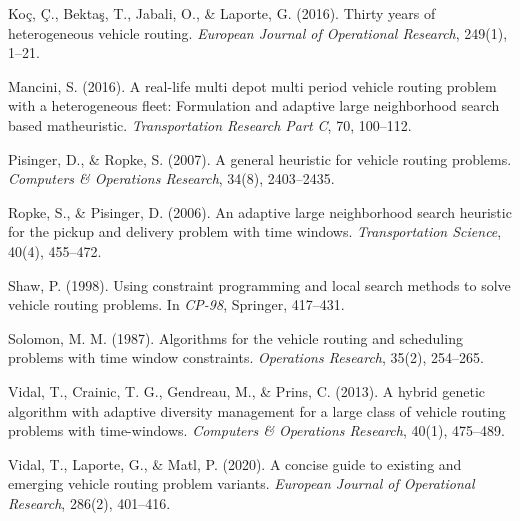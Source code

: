 \documentclass[11pt]{article}
\begin{document}
\begin{enumerate}[label={[\arabic*]}, leftmargin=*, itemsep=2pt]
    \item Ko\c{c}, \c{C}., Bekta\c{s}, T., Jabali, O., \& Laporte, G. (2016). Thirty years of heterogeneous vehicle routing. \textit{European Journal of Operational Research}, 249(1), 1--21.
    \item Mancini, S. (2016). A real-life multi depot multi period vehicle routing problem with a heterogeneous fleet: Formulation and adaptive large neighborhood search based matheuristic. \textit{Transportation Research Part C}, 70, 100--112.
    \item Pisinger, D., \& Ropke, S. (2007). A general heuristic for vehicle routing problems. \textit{Computers \& Operations Research}, 34(8), 2403--2435.
    \item Ropke, S., \& Pisinger, D. (2006). An adaptive large neighborhood search heuristic for the pickup and delivery problem with time windows. \textit{Transportation Science}, 40(4), 455--472.
    \item Shaw, P. (1998). Using constraint programming and local search methods to solve vehicle routing problems. In \textit{CP-98}, Springer, 417--431.
    \item Solomon, M. M. (1987). Algorithms for the vehicle routing and scheduling problems with time window constraints. \textit{Operations Research}, 35(2), 254--265.
    \item Vidal, T., Crainic, T. G., Gendreau, M., \& Prins, C. (2013). A hybrid genetic algorithm with adaptive diversity management for a large class of vehicle routing problems with time-windows. \textit{Computers \& Operations Research}, 40(1), 475--489.
    \item Vidal, T., Laporte, G., \& Matl, P. (2020). A concise guide to existing and emerging vehicle routing problem variants. \textit{European Journal of Operational Research}, 286(2), 401--416.
\end{enumerate}
\end{document}
